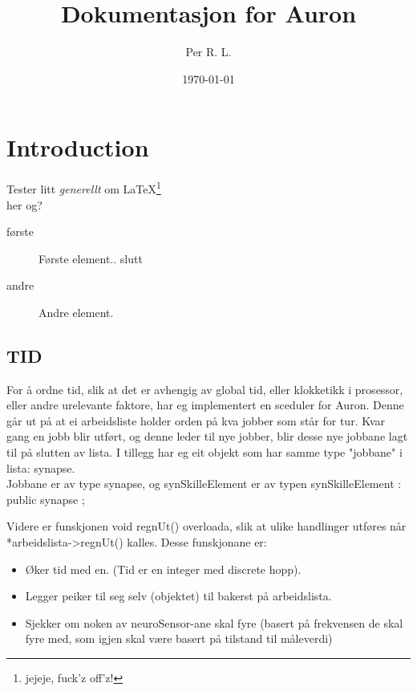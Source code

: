\documentclass[norsk,11 pt]{report}
\title{Dokumentasjon for Auron}
\author{Per R. L.}
\date{\today}
\begin{document}
   



\chapter{Introduction}

Tester litt \emph{generellt} om \LaTeX \footnote{jejeje, fuck'z off'z!} \\
\- her og?
\begin{description}
\item[første] Første element..  slutt
\item[andre] Andre element.
\end{description}





\section{TID}
For å ordne tid, slik at det er avhengig av global tid, eller klokketikk i prosessor, eller andre urelevante faktore, har eg implementert en sceduler for
Auron. Denne går ut på at ei arbeidsliste holder orden på kva jobber som står for tur. Kvar gang en jobb blir utført, og denne leder til nye jobber,
blir desse nye jobbane lagt til på slutten av lista. I tillegg har eg eit objekt som har samme type "jobbane" i lista: synapse. 
	\\Jobbane er av type synapse, og synSkilleElement er av typen synSkilleElement : public synapse ; 

Videre er funskjonen void regnUt() overloada, slik at ulike handlinger utføres når *arbeidslista->regnUt() kalles.
Desse funskjonane er:
\begin{itemize} 	%
\item	Øker tid med en. (Tid er en integer med discrete hopp).
\item	Legger peiker til seg selv (objektet) til bakerst på arbeidslista.
\item Sjekker om noken av neuroSensor-ane skal fyre (basert på frekvensen de skal fyre med, som igjen skal være basert på tilstand til måleverdi)
\end{itemize}
\end{document}
